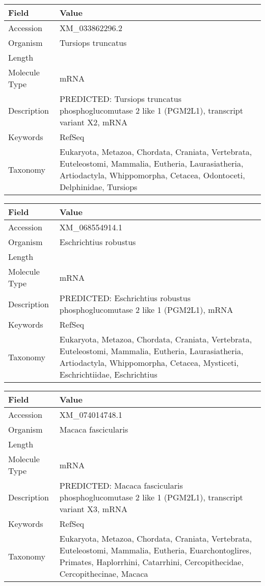 \documentclass[10pt]{article}
\begin{document}
{\footnotesize
\begin{longtable}{>{\raggedright\arraybackslash}p{4.5cm} >{\raggedright\arraybackslash}p{11.5cm}}
\textbf{Field} & \textbf{Value} \\
\hline
Accession & XM\_033862296.2 \\
Organism & Tursiops truncatus \\
Length & 3341 \\
Molecule Type & mRNA \\
Description & PREDICTED: Tursiops truncatus phosphoglucomutase 2 like 1 (PGM2L1), transcript variant X2, mRNA \\
Keywords & RefSeq \\
Taxonomy & Eukaryota, Metazoa, Chordata, Craniata, Vertebrata, Euteleostomi, Mammalia, Eutheria, Laurasiatheria, Artiodactyla, Whippomorpha, Cetacea, Odontoceti, Delphinidae, Tursiops \\
\end{longtable}
}

{\footnotesize
\begin{longtable}{>{\raggedright\arraybackslash}p{4.5cm} >{\raggedright\arraybackslash}p{11.5cm}}
\textbf{Field} & \textbf{Value} \\
\hline
Accession & XM\_068554914.1 \\
Organism & Eschrichtius robustus \\
Length & 2324 \\
Molecule Type & mRNA \\
Description & PREDICTED: Eschrichtius robustus phosphoglucomutase 2 like 1 (PGM2L1), mRNA \\
Keywords & RefSeq \\
Taxonomy & Eukaryota, Metazoa, Chordata, Craniata, Vertebrata, Euteleostomi, Mammalia, Eutheria, Laurasiatheria, Artiodactyla, Whippomorpha, Cetacea, Mysticeti, Eschrichtiidae, Eschrichtius \\
\end{longtable}
}

{\footnotesize
\begin{longtable}{>{\raggedright\arraybackslash}p{4.5cm} >{\raggedright\arraybackslash}p{11.5cm}}
\textbf{Field} & \textbf{Value} \\
\hline
Accession & XM\_074014748.1 \\
Organism & Macaca fascicularis \\
Length & 3874 \\
Molecule Type & mRNA \\
Description & PREDICTED: Macaca fascicularis phosphoglucomutase 2 like 1 (PGM2L1), transcript variant X3, mRNA \\
Keywords & RefSeq \\
Taxonomy & Eukaryota, Metazoa, Chordata, Craniata, Vertebrata, Euteleostomi, Mammalia, Eutheria, Euarchontoglires, Primates, Haplorrhini, Catarrhini, Cercopithecidae, Cercopithecinae, Macaca \\
\end{longtable}
}
\end{document}
